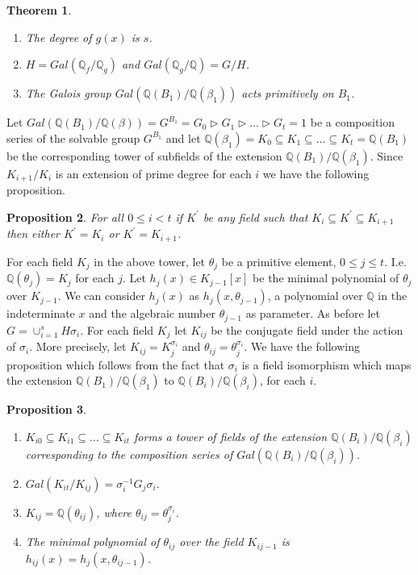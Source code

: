 \documentclass{article}
\newtheorem{theorem}{Theorem}[section]
\newtheorem{proposition}[theorem]{Proposition}
\newcommand{\Gal}[1]{\ensuremath{Gal\left(#1\right)}}
\newcommand{\Q}[0]{\ensuremath{\mathbb{Q}}}
\begin{document}
\begin{theorem}{\hfill{~}}\label{g:theorem}
  \begin{enumerate}
  \item The degree of $g(x)$ is $s$.
  \item $H = \Gal{\Q_f/\Q_g}$ and $\Gal{\Q_g/\Q} = G/H$.
  \item The Galois group $\Gal{\Q(B_1)/\Q(\beta_1)}$ acts primitively
    on $B_1$.
  \end{enumerate}
\end{theorem}

Let $\Gal{\Q(B_1)/\Q(\beta)} = G^{B_1} = G_0 \rhd G_1 \rhd \ldots \rhd
G_t = {1}$ be a composition series of the solvable group $G^{B_1}$ and
let $\Q(\beta_1) = K_0 \subseteq K_1 \subseteq \ldots \subseteq K_t =
\Q(B_1)$ be the corresponding tower of subfields of the extension
$\Q(B_1)/\Q(\beta_1)$. Since $K_{i+1}/K_i$ is an extension of prime
degree for each $i$ we have the following proposition.

\begin{proposition}\label{minimalextn}
  For all $0 \leq i < t$ if $K^\prime$ be any field such that
  $K_{i}\subseteq K^\prime \subseteq K_{i+1}$ then either $K^\prime =
  K_i$ or $K^\prime = K_{i+1}$.
\end{proposition}

For each field $K_j$ in the above tower, let $\theta_j$ be a primitive
element, $0 \leq j \leq t$. I.e. $\Q(\theta_j) = K_j$ for each $j$.
Let $h_j(x) \in K_{j-1}[x]$ be the minimal polynomial of $\theta_{j}$
over $K_{j-1}$. We can consider $h_j(x)$ as $h_j(x,\theta_{j-1})$, a
polynomial over $\Q$ in the indeterminate $x$ and the algebraic number
$\theta_{j-1}$ as parameter. As before let $G=\cup_{i=1}^s H\sigma_i$.
For each field $K_j$ let $K_{ij}$ be the conjugate field under the
action of $\sigma_i$. More precisely, let $K_{ij} = K_j^{\sigma_i}$
and $\theta_{ij} = \theta_j^{\sigma_i}$.  We have the following
proposition which follows from the fact that $\sigma_i$ is a field
isomorphism which maps the extension $\Q(B_1)/\Q(\beta_1)$ to
$\Q(B_i)/\Q(\beta_i)$, for each $i$.

\begin{proposition}{\hfill{~}}
  \begin{enumerate}
  \item $K_{i0} \subseteq K_{i1} \subseteq \ldots \subseteq K_{it}$
    forms a tower of fields of the extension $\Q(B_i)/\Q(\beta_i)$
    corresponding to the composition series of
    $\Gal{\Q(B_i)/\Q(\beta_i)}$.
  \item $\Gal{K_{it}/K_{ij}} = \sigma_i^{-1} G_j \sigma_i$.
  \item $K_{ij} = \Q(\theta_{ij})$, where $\theta_{ij} =
    \theta_j^{\sigma_i}$.
  \item The minimal polynomial of $\theta_{ij}$ over the field
    $K_{ij-1}$ is $h_{ij}(x) = h_j(x,\theta_{ij-1})$.
  \end{enumerate}
\end{proposition}
\end{document}
